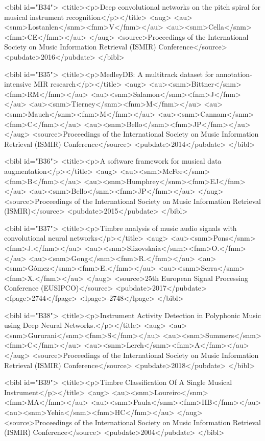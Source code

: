\documentclass{bmcart}
\begin{document}
\begin{backmatter}
{<bibl id="B34">
  <title><p>Deep convolutional networks on the pitch spiral for musical
  instrument recognition</p></title>
  <aug>
    <au><snm>Lostanlen</snm><fnm>V</fnm></au>
    <au><snm>Cella</snm><fnm>CE</fnm></au>
  </aug>
  <source>Proceedings of the International Society on Music Information
  Retrieval (ISMIR) Conference</source>
  <pubdate>2016</pubdate>
</bibl>

<bibl id="B35">
  <title><p>{MedleyDB: A multitrack dataset for annotation-intensive MIR
  research}</p></title>
  <aug>
    <au><snm>Bittner</snm><fnm>RM</fnm></au>
    <au><snm>Salamon</snm><fnm>J</fnm></au>
    <au><snm>Tierney</snm><fnm>M</fnm></au>
    <au><snm>Mauch</snm><fnm>M</fnm></au>
    <au><snm>Cannam</snm><fnm>C</fnm></au>
    <au><snm>Bello</snm><fnm>JP</fnm></au>
  </aug>
  <source>Proceedings of the International Society on Music Information
  Retrieval (ISMIR) Conference</source>
  <pubdate>2014</pubdate>
</bibl>

<bibl id="B36">
  <title><p>A software framework for musical data augmentation</p></title>
  <aug>
    <au><snm>McFee</snm><fnm>B</fnm></au>
    <au><snm>Humphrey</snm><fnm>EJ</fnm></au>
    <au><snm>Bello</snm><fnm>JP</fnm></au>
  </aug>
  <source>Proceedings of the International Society on Music Information
  Retrieval (ISMIR)</source>
  <pubdate>2015</pubdate>
</bibl>

<bibl id="B37">
  <title><p>Timbre analysis of music audio signals with convolutional neural
  networks</p></title>
  <aug>
    <au><snm>{Pons}</snm><fnm>J.</fnm></au>
    <au><snm>{Slizovskaia}</snm><fnm>O.</fnm></au>
    <au><snm>{Gong}</snm><fnm>R.</fnm></au>
    <au><snm>{G\'{o}mez}</snm><fnm>E.</fnm></au>
    <au><snm>{Serra}</snm><fnm>X.</fnm></au>
  </aug>
  <source>25th European Signal Processing Conference (EUSIPCO)</source>
  <pubdate>2017</pubdate>
  <fpage>2744</fpage>
  <lpage>-2748</lpage>
</bibl>

<bibl id="B38">
  <title><p>Instrument Activity Detection in Polyphonic Music using Deep Neural
  Networks.</p></title>
  <aug>
    <au><snm>Gururani</snm><fnm>S</fnm></au>
    <au><snm>Summers</snm><fnm>C</fnm></au>
    <au><snm>Lerch</snm><fnm>A</fnm></au>
  </aug>
  <source>Proceedings of the International Society on Music Information
  Retrieval (ISMIR) Conference</source>
  <pubdate>2018</pubdate>
</bibl>

<bibl id="B39">
  <title><p>Timbre Classification Of A Single Musical Instrument</p></title>
  <aug>
    <au><snm>Loureiro</snm><fnm>MA</fnm></au>
    <au><snm>Paula</snm><fnm>HB</fnm></au>
    <au><snm>Yehia</snm><fnm>HC</fnm></au>
  </aug>
  <source>Proceedings of the International Society on Music Information
  Retrieval (ISMIR) Conference</source>
  <pubdate>2004</pubdate>
</bibl>

}
\end{backmatter}
\end{document}
